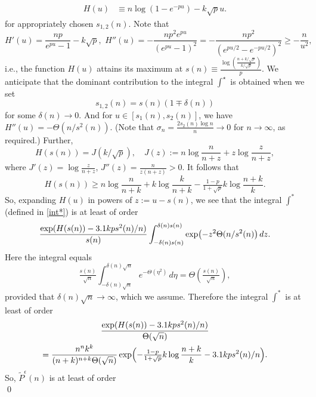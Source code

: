 \documentclass[10pt,a4paper]{amsart}
\newenvironment{proof}{\noindent{\bf Proof:}}{\qed}
\begin{document}
\begin{proof}
\begin{equation}
\begin{aligned}
 H(u)& \equiv n\log (1 - e^{-pu})-k\sqrt{p}u.
\end{aligned}
\end{equation}
for appropriately chosen $s_{1,2}(n)$. Note that
\begin{equation*}
H'(u)=\frac{np}{e^{pu}-1}-k\sqrt{p},\,\, H''(u)=-\frac{np^2e^{pu}}{(e^{pu}-1)^2}
=-\frac{np^2}{(e^{pu/2}-e^{-pu/2})^2}\ge-\frac{n}{u^2},
\end{equation*}
i.e., the function $H(u)$ attains its maximum at 
$s(n) \equiv \frac{\log \left(\frac{n+k/\sqrt{p}}{k/\sqrt{p}}\right)}{p}$.
We anticipate that the dominant contribution to the integral $\int^\star$ is obtained when we set  
\begin{equation*}
 s_{1,2}(n)=s(n)(1\mp\delta(n))
\end{equation*}
for some $\delta(n) \to 0$. And for $u\in [s_1(n),s_2(n)]$, we have $H''(u)=-\Theta(n/s^2(n))$. (Note that $\sigma_n=\frac{2s_2(n)\log n}{n}\to 0$ for $n \to \infty$, as required.) Further, 
\begin{equation*}
H(s(n))=J(k/\sqrt{p}), \quad J(z):=n\log\frac{n}{n+z}+z\log\frac{z}{n+z},
\end{equation*}
where $J'(z)=\log\tfrac{z}{n+z}$, $J''(z)=\tfrac{n}{z(n+z)}>0$. It follows that 
\begin{equation*}
H(s(n))\ge n\log\frac{n}{n+k}+k\log\frac{k}{n+k}-\tfrac{1-p}{1+\sqrt{p}}k\log\frac{n+k}{k}.
\end{equation*}
So, expanding $H(u)$ in powers of $z:=u-s(n)$, we see that the integral $\int^*$ (defined in \eqref{int*}) is at least of order
\[
\frac{\exp(H(s(n))-3.1kps^2(n)/n)}{s(n)}\int_{-\delta(n)s(n)}^{\delta(n)s(n)}\exp\bigl(-z^2\Theta(n/s^2(n)\bigr)\,dz.\\
\]
Here the integral equals
\[
\tfrac{s(n)}{\sqrt{n}}\int_{-\delta(n)\sqrt{n}}^{\delta(n)\sqrt{n}}e^{-\Theta(\eta^2)}\,d\eta=\Theta(\tfrac{s(n)}{\sqrt{n}}),
\]
provided that $\delta (n)\sqrt{n}\to\infty$, which we assume. Therefore the integral $\int^*$ is at least of order
\begin{multline*}
\frac{\exp(H(s(n))-3.1kps^2(n)/n)}{\Theta(\sqrt{n})}\\
=\frac{n^n k^k}{(n+k)^{n+k}\Theta(\sqrt{n})}\exp\Bigl(-\tfrac{1-p}{1+\sqrt{p}}k\log\frac{n+k}{k}-3.1kps^2(n)/n\Bigr).
\end{multline*}
So, $\tilde{P}^\epsilon(n)$ is at least of order 
\begin{equation*}

\end{equation*}
\end{proof}
\end{document}
